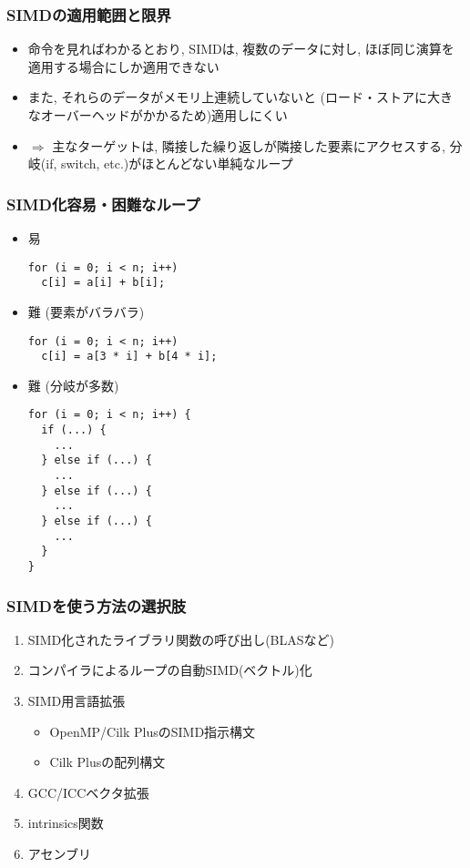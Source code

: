\documentclass[10pt,dvipdfmx]{beamer}
\newcommand{\ao}[1]{{\color{blue}#1}}
\begin{document}
\begin{frame}
\frametitle{SIMDの適用範囲と限界}
\begin{itemize}
\item 命令を見ればわかるとおり, SIMDは,
  複数のデータに対し, ほぼ同じ演算を適用する場合にしか適用できない
\item また, それらのデータがメモリ上連続していないと
  (ロード・ストアに大きなオーバーヘッドがかかるため)適用しにくい

\item $\Rightarrow$ 主なターゲットは,
  隣接した繰り返しが隣接した要素にアクセスする,
  分岐(if, switch, etc.)がほとんどない単純なループ
\end{itemize}
\end{frame}

\begin{frame}[fragile]
\frametitle{SIMD化容易・困難なループ}
\begin{itemize}
\item [] 易
\begin{lstlisting}
for (i = 0; i < n; i++)
  c[i] = a[i] + b[i];
\end{lstlisting}
  \item [] 難 (要素がバラバラ)
\begin{lstlisting}
for (i = 0; i < n; i++)
  c[i] = a[3 * i] + b[4 * i];
\end{lstlisting}
  \item [] 難 (分岐が多数)
\begin{lstlisting}
for (i = 0; i < n; i++) {
  if (...) {
    ...
  } else if (...) {
    ...
  } else if (...) {
    ...
  } else if (...) {
    ...
  }
}
\end{lstlisting}
\end{itemize}
\end{frame}

\begin{frame}[fragile]
\frametitle{SIMDを使う方法の選択肢}
\begin{enumerate}
\item SIMD化されたライブラリ関数の呼び出し(BLASなど)
\item コンパイラによるループの自動SIMD(ベクトル)化
\item SIMD用言語拡張
  \begin{itemize}
  \item OpenMP/Cilk PlusのSIMD指示構文
  \item Cilk Plusの配列構文
  \end{itemize}
\item \ao{GCC/ICCベクタ拡張}
\item \ao{intrinsics関数} 
\item アセンブリ
\end{enumerate}
\end{frame}
\end{document}
